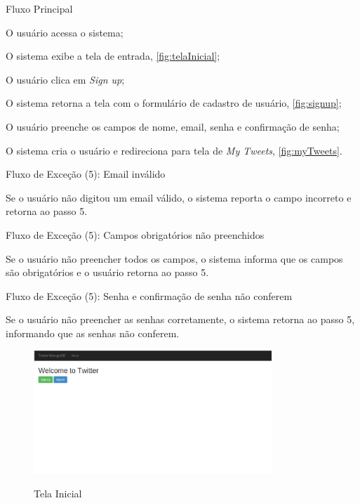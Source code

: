 Fluxo Principal\begin{enumerate}
{\setlength\itemindent{25pt}
    \item O usuário acessa o sistema;
    \item O sistema exibe a tela de entrada, \autoref{fig:telaInicial};
    \item O usuário clica em \textit{Sign up};
    \item O sistema retorna a tela com o formulário de cadastro de usuário, \autoref{fig:signup};
    \item O usuário preenche os campos de nome, email, senha e confirmação de senha;
    \item O sistema cria o usuário e redireciona para tela de \textit{My Tweets}, \autoref{fig:myTweets}.
}
\end{enumerate}

Fluxo de Exceção (5): Email inválido
\begin{enumerate}
{\setlength\itemindent{25pt}
\item Se o usuário não digitou um email válido, o sistema reporta o campo incorreto e retorna ao passo 5.
}
\end{enumerate}

Fluxo de Exceção (5): Campos obrigatórios não preenchidos
\begin{enumerate}
{\setlength\itemindent{25pt}
\item Se o usuário não preencher todos os campos, o sistema informa que os campos são obrigatórios e o usuário retorna ao passo 5.
}
\end{enumerate}

Fluxo de Exceção (5): Senha e confirmação de senha não conferem
\begin{enumerate}
{\setlength\itemindent{25pt}
\item Se o usuário não preencher as senhas corretamente, o sistema retorna ao passo 5, informando que as senhas não conferem.
}
\end{enumerate}

\begin{figure}[H]
    \centering
    \caption{Tela Inicial}
    \includegraphics[width=0.8\textwidth]{./04-figuras/PrimeiraTela.png}
    \label{fig:telaInicial}
\end{figure}

